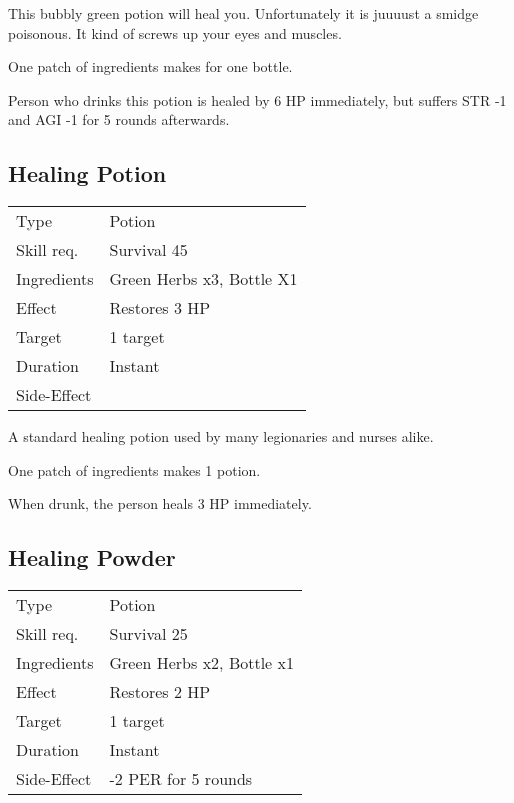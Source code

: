 \documentclass[11pt,a4paper,twocolumn]{book}
\begin{document}
\medskip

This bubbly green potion will heal you. Unfortunately it is juuuust a smidge poisonous. It kind of screws up your eyes and muscles.

One patch of ingredients makes for one bottle.

Person who drinks this potion is healed by 6 HP immediately, but suffers STR -1 and AGI -1 for 5 rounds afterwards.


\subsection*{Healing Potion}
{
	\begin{tabu} to 75mm{| X[l,4] | X[l,8] |}
		\hline
		Type 			& Potion 						\\
		Skill req.	    & Survival 45 					\\
		Ingredients     & Green Herbs x3, Bottle X1		\\
		Effect     		& Restores 3 HP 				\\
		Target      	& 1 target						\\
		Duration  		& Instant	 					\\
		Side-Effect     & 								\\ \hline
	\end{tabu}
	
}

\medskip

A standard healing potion used by many legionaries and nurses alike.

One patch of ingredients makes 1 potion.

When drunk, the person heals 3 HP immediately.


\subsection*{Healing Powder}
{
	\begin{tabu} to 75mm{| X[l,4] | X[l,8] |}
		\hline
		Type 			& Potion 								\\
		Skill req.	    & Survival 25 							\\
		Ingredients     & Green Herbs x2, Bottle x1				\\
		Effect     		& Restores 2 HP 						\\
		Target      	& 1 target								\\
		Duration  		& Instant	 							\\
		Side-Effect     & -2 PER for 5 rounds								\\ \hline
	\end{tabu}
	
}
\end{document}
